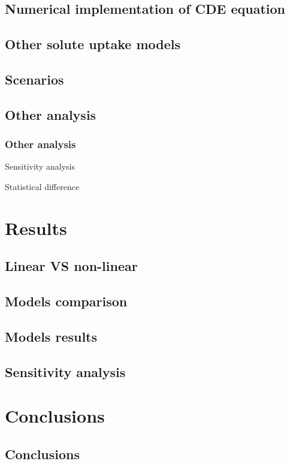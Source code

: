 \documentclass[compress]{beamer}  %
\begin{document}
\subsection{Numerical implementation of CDE equation}
\begin{frame}
\end{frame}

\subsection{Other solute uptake models}
\begin{frame}
\end{frame}

\subsection{Scenarios}
\begin{frame}
\end{frame}

\subsection{Other analysis}
\begin{frame}
\frametitle{Other analysis}
Sensitivity analysis

Statistical difference
\end{frame}

\section{Results}

\subsection{Linear VS non-linear}
\begin{frame}
\end{frame}

\subsection{Models comparison}
\begin{frame}
\end{frame}

\subsection{Models results}
\begin{frame}
\end{frame}

\subsection{Sensitivity analysis}
\begin{frame}
\end{frame}

\section{Conclusions}
\subsection{Conclusions}
\begin{frame}
\end{frame}
\end{document}
